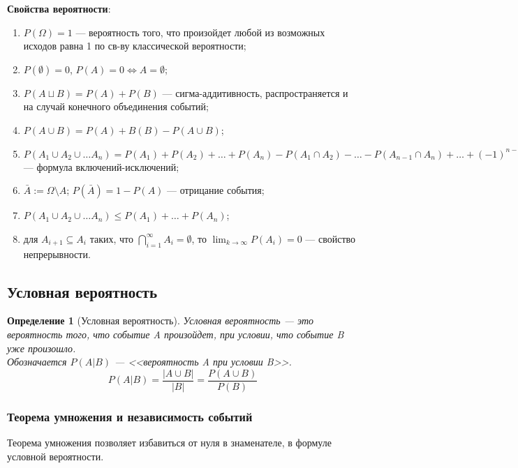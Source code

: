 \documentclass{article}
\theoremstyle{mydef}
\newtheorem{definition}{Определение}
\theoremstyle{myth}
\begin{document}
\textbf{Свойства вероятности}:
\begin{enumerate}
    \item $P(\Omega) = 1$ --- вероятность того, что произойдет любой из возможных исходов равна 1 по св-ву классической вероятности;
    \item $P(\emptyset) = 0$, $P(A) = 0 \Leftrightarrow  A = \emptyset$;
    \item $P(A \sqcup B) = P(A) + P(B)$ --- сигма-аддитивность, распространяется и на случай конечного объединения событий;
    \item $P(A \cup B) = P(A) + B(B) - P(A \cup B)$;
    \item $P(A_1 \cup A_2 \cup \ldots A_n) = P(A_1) + P(A_2) + \ldots + P(A_n) - P(A_1 \cap A_2) - \ldots - P(A_{n-1} \cap A_n) + \ldots + (-1)^{n-1} P(A_1 \cap \ldots \cap A_n)$ --- формула включений-исключений;
    \item $\bar{A} := \Omega \setminus A$; $P(\bar{A}) = 1 - P(A)$ --- отрицание события; 
    \item $P(A_1 \cup A_2 \cup \ldots A_n) \leq P(A_1) + \ldots + P(A_n)$;
    \item для $A_{i+1} \subseteq A_i$ таких, что $\bigcap_{i=1}^{\infty} A_i = \emptyset$, то $\lim_{k \to \infty} P(A_i) = 0$ --- свойство непрерывности. 
\end{enumerate}

\subsection{Условная вероятность}
 
\begin{definition}[Условная вероятность]
    Условная вероятность --- это вероятность того, что событие A произойдет, при условии, что событие B уже произошло. \\
    Обозначается $P(A|B)$ --- <<вероятность A при условии B>>. \\
    \begin{equation}
        P(A|B) = \frac{|A\cup B|}{|B|} = \frac{P(A \cup B)}{P(B)}
    \end{equation}
\end{definition}

\subsubsection{Теорема умножения и независимость событий}

Теорема умножения позволяет избавиться от нуля в знаменателе, в формуле условной вероятности.
\end{document}
